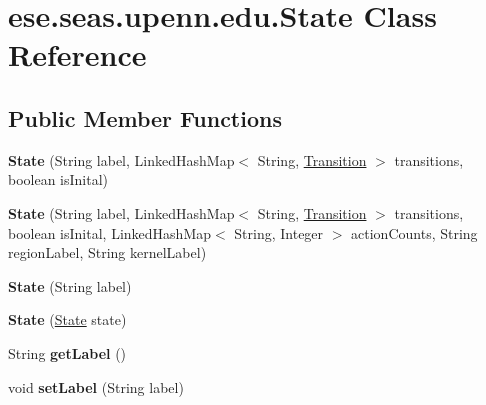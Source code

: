 \hypertarget{classese_1_1seas_1_1upenn_1_1edu_1_1_state}{}\section{ese.\+seas.\+upenn.\+edu.\+State Class Reference}
\label{classese_1_1seas_1_1upenn_1_1edu_1_1_state}
\subsection*{Public Member Functions}
\begin{DoxyCompactItemize}
\item 
\hypertarget{classese_1_1seas_1_1upenn_1_1edu_1_1_state_a46c6ce319257a9522f8427cc51b4beca}{}{\bfseries State} (String label, Linked\+Hash\+Map$<$ String, \hyperlink{classese_1_1seas_1_1upenn_1_1edu_1_1_transition}{Transition} $>$ transitions, boolean is\+Inital)\label{classese_1_1seas_1_1upenn_1_1edu_1_1_state_a46c6ce319257a9522f8427cc51b4beca}

\item 
\hypertarget{classese_1_1seas_1_1upenn_1_1edu_1_1_state_a565b9e44a4d812b767834b423064e942}{}{\bfseries State} (String label, Linked\+Hash\+Map$<$ String, \hyperlink{classese_1_1seas_1_1upenn_1_1edu_1_1_transition}{Transition} $>$ transitions, boolean is\+Inital, Linked\+Hash\+Map$<$ String, Integer $>$ action\+Counts, String region\+Label, String kernel\+Label)\label{classese_1_1seas_1_1upenn_1_1edu_1_1_state_a565b9e44a4d812b767834b423064e942}

\item 
\hypertarget{classese_1_1seas_1_1upenn_1_1edu_1_1_state_ac55ed67de827404560d5150c18c22bef}{}{\bfseries State} (String label)\label{classese_1_1seas_1_1upenn_1_1edu_1_1_state_ac55ed67de827404560d5150c18c22bef}

\item 
\hypertarget{classese_1_1seas_1_1upenn_1_1edu_1_1_state_a69d1b48308a6edf25c382530b1fb0568}{}{\bfseries State} (\hyperlink{classese_1_1seas_1_1upenn_1_1edu_1_1_state}{State} state)\label{classese_1_1seas_1_1upenn_1_1edu_1_1_state_a69d1b48308a6edf25c382530b1fb0568}

\item 
\hypertarget{classese_1_1seas_1_1upenn_1_1edu_1_1_state_a9f0ff2c851cc79f1f785939b4559de99}{}String {\bfseries get\+Label} ()\label{classese_1_1seas_1_1upenn_1_1edu_1_1_state_a9f0ff2c851cc79f1f785939b4559de99}

\item 
\hypertarget{classese_1_1seas_1_1upenn_1_1edu_1_1_state_a3f30d5f8386dbbb0e476d8340b473e12}{}void {\bfseries set\+Label} (String label)\label{classese_1_1seas_1_1upenn_1_1edu_1_1_state_a3f30d5f8386dbbb0e476d8340b473e12}


\end{DoxyCompactItemize}
